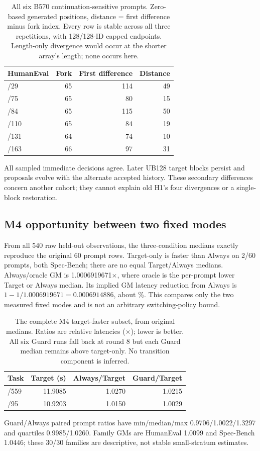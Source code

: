 \begin{table}[t]
\caption{All six B570 continuation-sensitive prompts. Zero-based generated positions, distance = first difference minus fork index. Every row is stable across all three repetitions, with 128/128-ID capped endpoints. Length-only divergence would occur at the shorter array's length; none occurs here.}
\label{tab:forkpositions}
\centering
\begin{tabular}{lrrr}
\toprule
HumanEval & Fork & First difference & Distance \\
\midrule
/29 & 65 & 114 & 49 \\
/75 & 65 & 80 & 15 \\
/84 & 65 & 115 & 50 \\
/110 & 65 & 84 & 19 \\
/131 & 64 & 74 & 10 \\
/163 & 66 & 97 & 31 \\
\bottomrule
\end{tabular}
\end{table}
All sampled immediate decisions agree. Later UB128 target blocks persist and proposals evolve with the alternate accepted history. These secondary differences concern another cohort; they cannot explain old H1's four divergences or a single-block restoration.

\subsection{M4 opportunity between two fixed modes}
From all 540 raw held-out observations, the three-condition medians exactly reproduce the original 60 prompt rows. Target-only is faster than Always on 2/60 prompts, both Spec-Bench; there are no equal Target/Always medians. Always/oracle GM is 1.0006919671$\times$, where oracle is the per-prompt lower Target or Always median. Its implied GM latency reduction from Always is $1-1/1.0006919671=0.0006914886$, about \DiagMOpportunity\%. This compares only the two measured fixed modes and is not an arbitrary switching-policy bound.
\begin{table}[t]
\caption{The complete M4 target-faster subset, from original medians. Ratios are relative latencies ($\times$); lower is better. All six Guard runs fall back at round 8 but each Guard median remains above target-only. No transition component is inferred.}
\label{tab:m4opportunity}
\centering
\begin{tabular}{lrrr}
\toprule
Task & Target (s) & Always/Target & Guard/Target \\
\midrule
/559 & 11.9085 & 1.0270 & 1.0215 \\
/95 & 10.9203 & 1.0150 & 1.0029 \\
\bottomrule
\end{tabular}
\end{table}
Guard/Always paired prompt ratios have min/median/max 0.9706/1.0022/1.3297 and quartiles 0.9985/1.0260. Family GMs are HumanEval 1.0099 and Spec-Bench 1.0446; these 30/30 families are descriptive, not stable small-stratum estimates.

